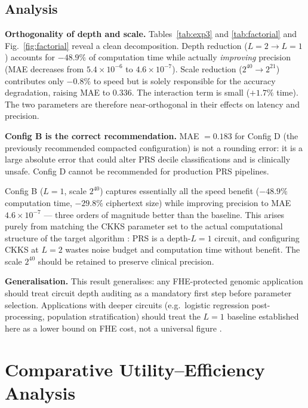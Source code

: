 \documentclass[conference]{IEEEtran}
\begin{document}
\subsection{Analysis}

\textbf{Orthogonality of depth and scale.} Tables~\ref{tab:exp3} and \ref{tab:factorial} and Fig.~\ref{fig:factorial}
reveal a clean decomposition. Depth reduction ($L=2\to L=1$)
accounts for $-48.9\%$ of computation time while actually \emph{improving}
precision (MAE decreases from $5.4\times10^{-6}$ to $4.6\times10^{-7}$).
Scale reduction ($2^{40}\to2^{21}$) contributes only $-0.8\%$ to speed but
is solely responsible for the accuracy degradation, raising MAE to $0.336$.
The interaction term is small ($+1.7\%$ time). The two parameters are therefore
near-orthogonal in their effects on latency and precision.

\textbf{Config B is the correct recommendation.} MAE $= 0.183$ for Config D
(the previously recommended compacted configuration) is not a rounding error:
it is a large absolute error that could alter PRS decile classifications and is
clinically unsafe. Config D cannot be recommended for production PRS pipelines.

Config B ($L=1$, scale $2^{40}$) captures essentially all the speed benefit
($-48.9\%$ computation time, $-29.8\%$ ciphertext size) while improving
precision to MAE $4.6\times10^{-7}$ --- three orders of magnitude better than
the baseline. This arises purely from matching the CKKS parameter set to the
actual computational structure of the target algorithm \cite{blatt2020,
cheon2019}: PRS is a depth-$L=1$ circuit, and configuring CKKS at $L=2$ wastes
noise budget and computation time without benefit. The scale $2^{40}$ should
be retained to preserve clinical precision.

\textbf{Generalisation.} This result generalises: any FHE-protected genomic
application should treat circuit depth auditing as a mandatory first step
before parameter selection. Applications with deeper circuits (e.g.\ logistic
regression post-processing, population stratification) should treat the $L=1$
baseline established here as a lower bound on FHE cost, not a universal figure
\cite{kim2018,raisaro2018}.

\section{Comparative Utility--Efficiency Analysis}
\end{document}
